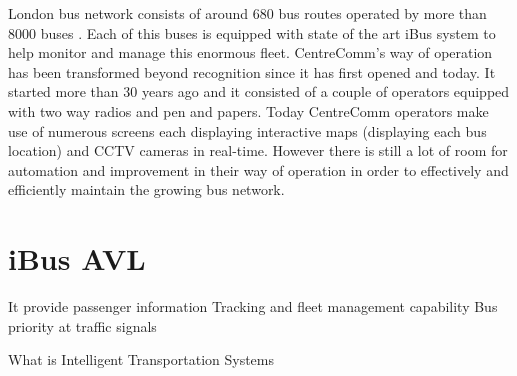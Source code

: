 London bus network consists of around 680 bus routes operated by more than 8000 buses \cite{glads}. Each of this buses is equipped with state of the art iBus system to help monitor and manage this enormous fleet. CentreComm's way of operation has been transformed beyond recognition since it has first opened and today. It started more than 30 years ago \cite{centreComm} and it consisted of a couple of operators equipped with two way radios and pen and papers. Today CentreComm operators make use of numerous screens each displaying interactive maps (displaying each bus location) and CCTV cameras in real-time. However there is still a lot of room for automation and improvement in their way of operation in order to effectively and efficiently maintain the growing bus network.

\section{iBus AVL}
It provide passenger information
Tracking and fleet management capability
Bus priority at traffic signals

What is Intelligent Transportation Systems 

